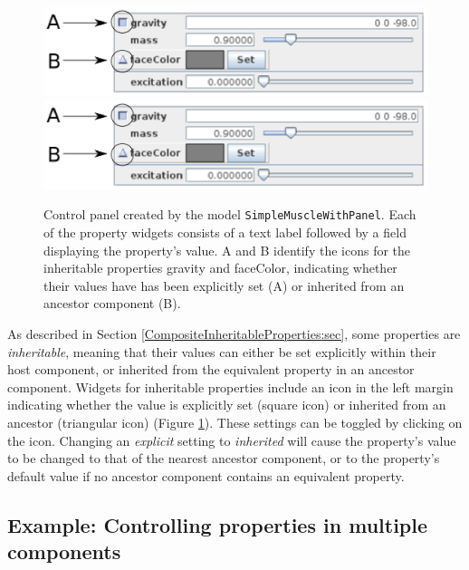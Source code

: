 \begin{figure}[ht]
\begin{center}
\iflatexml
 \includegraphics[]{images/controlPanelAnnotated}
\else
 \includegraphics[width=4.5in]{images/controlPanelAnnotated}
\fi
\end{center}
\caption{Control panel created by the model {\tt SimpleMuscleWithPanel}.
Each of the property widgets consists of a text label followed by a
field displaying the property's value. A and B identify the icons for
the inheritable properties {\sf gravity} and {\sf faceColor},
indicating whether their values have has been explicitly set (A) or
inherited from an ancestor component (B).}
\label{controlPanel:fig}
\end{figure}

As described in Section \ref{CompositeInheritableProperties:sec}, some
properties are {\it inheritable}, meaning that their values can either
be set explicitly within their host component, or inherited from the
equivalent property in an ancestor component. Widgets for inheritable
properties include an icon in the left margin indicating whether the
value is explicitly set (square icon) or inherited from an ancestor
(triangular icon) (Figure \ref{controlPanel:fig}). These settings can
be toggled by clicking on the icon. Changing an {\it explicit} setting
to {\it inherited} will cause the property's value to be changed to
that of the nearest ancestor component, or to the property's default
value if no ancestor component contains an equivalent property.


\subsection{Example: Controlling properties in multiple components}
\label{PropForMultComps:sec}

